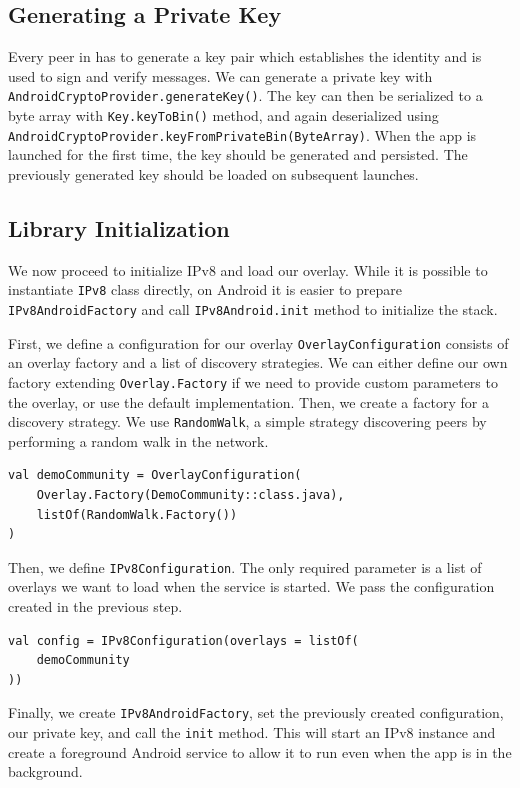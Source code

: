 \subsection{Generating a Private Key}

Every peer in has to generate a key pair which establishes the identity and is used to sign and verify messages. We can generate a private key with \texttt{AndroidCryptoProvider.generateKey()}. The key can then be serialized to a byte array with \texttt{Key.keyToBin()} method, and again deserialized using \texttt{AndroidCryptoProvider.keyFromPrivateBin(ByteArray)}. When the app is launched for the first time, the key should be generated and persisted. The previously generated key should be loaded on subsequent launches.

\subsection{Library Initialization}

We now proceed to initialize IPv8 and load our overlay. While it is possible to instantiate \texttt{IPv8} class directly, on Android it is easier to prepare \texttt{IPv8AndroidFactory} and call \texttt{IPv8Android.init} method to initialize the stack.

First, we define a configuration for our overlay \texttt{OverlayConfiguration} consists of an overlay factory and a list of discovery strategies. We can either define our own factory extending \texttt{Overlay.Factory} if we need to provide custom parameters to the overlay, or use the default implementation. Then, we create a factory for a discovery strategy. We use \texttt{RandomWalk}, a simple strategy discovering peers by performing a random walk in the network.

\begin{verbatim}
val demoCommunity = OverlayConfiguration(
    Overlay.Factory(DemoCommunity::class.java),
    listOf(RandomWalk.Factory())
)
\end{verbatim}

Then, we define \texttt{IPv8Configuration}. The only required parameter is a list of overlays we want to load when the service is started. We pass the configuration created in the previous step.

\begin{verbatim}
val config = IPv8Configuration(overlays = listOf(
    demoCommunity
))
\end{verbatim}

Finally, we create \texttt{IPv8AndroidFactory}, set the previously created configuration, our private key, and call the \texttt{init} method. This will start an IPv8 instance and create a foreground Android service to allow it to run even when the app is in the background.

